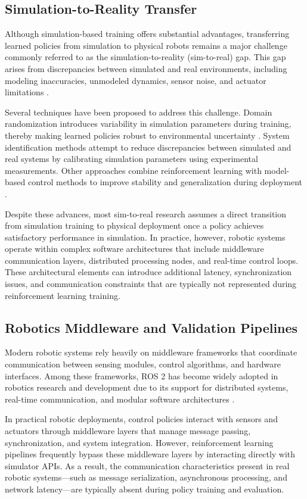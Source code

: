 \documentclass[pdflatex,sn-mathphys-num]{sn-jnl}%
\theoremstyle{thmstyleone}%
\theoremstyle{thmstyletwo}%
\theoremstyle{thmstylethree}%
\begin{document}
\subsection{Simulation-to-Reality Transfer}
Although simulation-based training offers substantial advantages, transferring learned policies from simulation to physical robots remains a major challenge commonly referred to as the simulation-to-reality (sim-to-real) gap. This gap arises from discrepancies between simulated and real environments, including modeling inaccuracies, unmodeled dynamics, sensor noise, and actuator limitations \cite{bib14}.

Several techniques have been proposed to address this challenge. Domain randomization introduces variability in simulation parameters during training, thereby making learned policies robust to environmental uncertainty \cite{bib15}. System identification methods attempt to reduce discrepancies between simulated and real systems by calibrating simulation parameters using experimental measurements. Other approaches combine reinforcement learning with model-based control methods to improve stability and generalization during deployment \cite{bib16}.

Despite these advances, most sim-to-real research assumes a direct transition from simulation training to physical deployment once a policy achieves satisfactory performance in simulation. In practice, however, robotic systems operate within complex software architectures that include middleware communication layers, distributed processing nodes, and real-time control loops. These architectural elements can introduce additional latency, synchronization issues, and communication constraints that are typically not represented during reinforcement learning training.

\subsection{Robotics Middleware and Validation Pipelines}
Modern robotic systems rely heavily on middleware frameworks that coordinate communication between sensing modules, control algorithms, and hardware interfaces. Among these frameworks, ROS 2 has become widely adopted in robotics research and development due to its support for distributed systems, real-time communication, and modular software architectures \cite{bib17}.

In practical robotic deployments, control policies interact with sensors and actuators through middleware layers that manage message passing, synchronization, and system integration. However, reinforcement learning pipelines frequently bypass these middleware layers by interacting directly with simulator APIs. As a result, the communication characteristics present in real robotic systems—such as message serialization, asynchronous processing, and network latency—are typically absent during policy training and evaluation.
\end{document}
